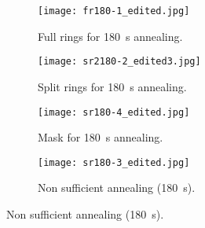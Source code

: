 \begin{figure}[htbp]
\begin{subfigure}{0.48\textwidth}
    \texttt{[image: fr180-1\_edited.jpg]}
    \caption{
        Full rings for \SI{180}{\second} annealing.
        }
    \label{fig:sem-fr1}
\end{subfigure}
\hfill
\begin{subfigure}{0.48\textwidth}
    \texttt{[image: sr2180-2\_edited3.jpg]}
    \caption{
        Split rings for \SI{180}{\second} annealing.
    }
    \label{fig:sem-sr1}
\end{subfigure}

\begin{subfigure}{0.48\textwidth}
    \texttt{[image: sr180-4\_edited.jpg]}
    \caption{
        Mask for \SI{180}{\second} annealing.
    }
    \label{fig:sem-mask}
\end{subfigure}
\hfill
\begin{subfigure}{0.48\textwidth}
    \texttt{[image: sr180-3\_edited.jpg]}
    \caption{
        Non sufficient annealing (\SI{180}{\second}).
    }
    \label{fig:sem-nsa}
\end{subfigure}
\end{figure}